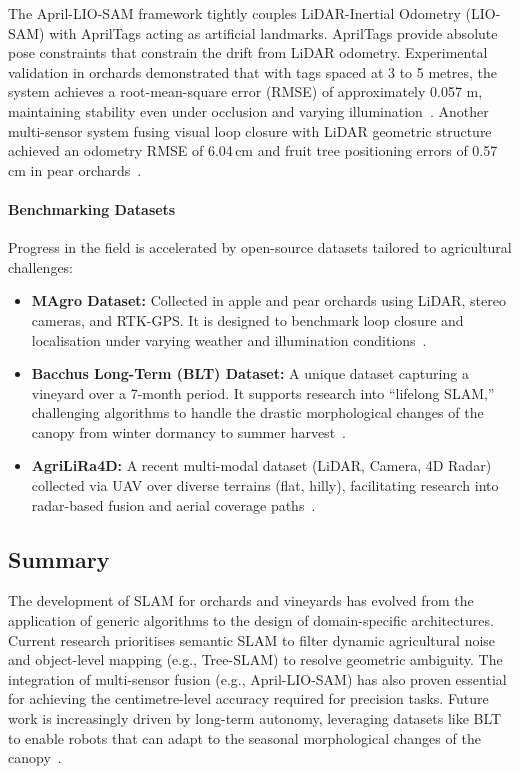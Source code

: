 The April-LIO-SAM framework tightly couples LiDAR-Inertial Odometry (LIO-SAM) with AprilTags acting as artificial landmarks. AprilTags provide absolute pose constraints that constrain the drift from LiDAR odometry. Experimental validation in orchards demonstrated that with tags spaced at 3 to 5 metres, the system achieves a root-mean-square error (RMSE) of approximately 0.057 m, maintaining stability even under occlusion and varying illumination~\cite{guanResearchAgriculturalAutonomous2025}. Another multi-sensor system fusing visual loop closure with LiDAR geometric structure achieved an odometry RMSE of 6.04\,cm and fruit tree positioning errors of 0.57\,cm in pear orchards~\cite{tangFruitTreeMappingSystem2024}.

\paragraph{Benchmarking Datasets}
Progress in the field is accelerated by open-source datasets tailored to agricultural challenges:
\begin{itemize}
    \item \textbf{MAgro Dataset:} Collected in apple and pear orchards using LiDAR, stereo cameras, and RTK-GPS. It is designed to benchmark loop closure and localisation under varying weather and illumination conditions~\cite{schmidtROVERMultiSeasonDataset2024, marzoatancoMAgroDatasetDataset2024}.
    \item \textbf{Bacchus Long-Term (BLT) Dataset:} A unique dataset capturing a vineyard over a 7-month period. It supports research into ``lifelong SLAM,'' challenging algorithms to handle the drastic morphological changes of the canopy from winter dormancy to summer harvest~\cite{polvaraBacchusLongTermBLT2024}.
    \item \textbf{AgriLiRa4D:} A recent multi-modal dataset (LiDAR, Camera, 4D Radar) collected via UAV over diverse terrains (flat, hilly), facilitating research into radar-based fusion and aerial coverage paths~\cite{zhanAgriLiRa4DMultiSensorUAV2026}.
\end{itemize}

\subsection{Summary}
\label{subsec:vineyard-robotics-summary}
The development of SLAM for orchards and vineyards has evolved from the application of generic algorithms to the design of domain-specific architectures. Current research prioritises semantic SLAM to filter dynamic agricultural noise and object-level mapping (e.g., Tree-SLAM) to resolve geometric ambiguity. The integration of multi-sensor fusion (e.g., April-LIO-SAM) has also proven essential for achieving the centimetre-level accuracy required for precision tasks. Future work is increasingly driven by long-term autonomy, leveraging datasets like BLT to enable robots that can adapt to the seasonal morphological changes of the canopy~\cite{tangFruitTreeMappingSystem2024, polvaraBacchusLongTermBLT2024}.

